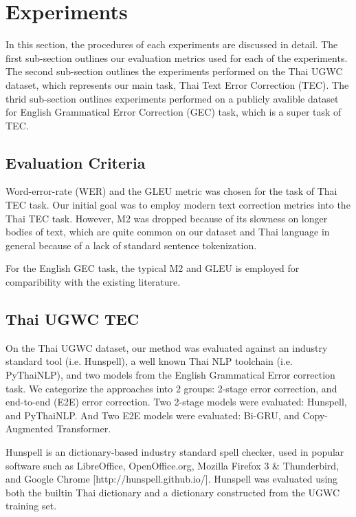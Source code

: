 \section{Experiments}

In this section, the procedures of each experiments are discussed in detail. The first sub-section outlines our evaluation metrics used for each of the experiments. The second sub-section outlines the experiments performed on the Thai UGWC dataset, which represents our main task, Thai Text Error Correction (TEC). The thrid sub-section outlines experiments performed on a publicly avalible dataset for English Grammatical Error Correction (GEC) task, which is a super task of TEC.

\subsection{Evaluation Criteria}

Word-error-rate (WER) and the GLEU metric was chosen for the task of Thai TEC task. Our initial goal was to employ modern text correction metrics into the Thai TEC task. However, M2 was dropped because of its slowness on longer bodies of text, which are quite common on our dataset and Thai language in general because of a lack of standard sentence tokenization.


For the English GEC task, the typical M2 and GLEU is employed for comparibility with the existing literature.

\subsection{Thai UGWC TEC}

On the Thai UGWC dataset, our method was evaluated against an industry standard tool (i.e. Hunspell), a well known Thai NLP toolchain (i.e. PyThaiNLP), and two models from the English Grammatical Error correction task. We categorize the approaches into 2 groups: 2-stage error correction, and end-to-end (E2E) error correction. Two 2-stage models were evaluated: Hunspell, and PyThaiNLP. And Two E2E models were evaluated: Bi-GRU, and Copy-Augmented Transformer.

Hunspell is an dictionary-based industry standard spell checker, used in popular software such as LibreOffice, OpenOffice.org, Mozilla Firefox 3 \& Thunderbird, and Google Chrome [http://hunspell.github.io/]. Hunspell was evaluated using both the builtin Thai dictionary and a dictionary constructed from the UGWC training set.

